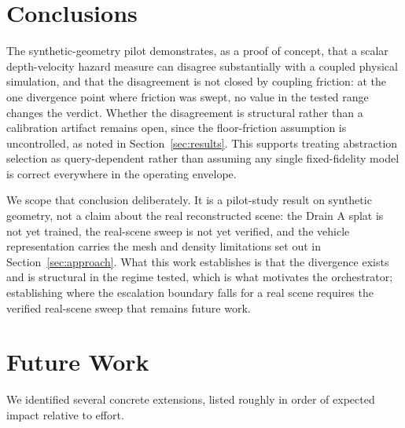 \documentclass[conference]{IEEEtran}
\begin{document}
\section{Conclusions}
\label{sec:conclusions}

The synthetic-geometry pilot demonstrates, as a proof of concept, that a scalar depth-velocity hazard measure can disagree substantially with a coupled physical simulation, and that the disagreement is not closed by coupling friction: at the one divergence point where friction was swept, no value in the tested range changes the verdict. Whether the disagreement is structural rather than a calibration artifact remains open, since the floor-friction assumption is uncontrolled, as noted in Section~\ref{sec:results}. This supports treating abstraction selection as query-dependent rather than assuming any single fixed-fidelity model is correct everywhere in the operating envelope.

We scope that conclusion deliberately. It is a pilot-study result on synthetic geometry, not a claim about the real reconstructed scene: the Drain A splat is not yet trained, the real-scene sweep is not yet verified, and the vehicle representation carries the mesh and density limitations set out in Section~\ref{sec:approach}. What this work establishes is that the divergence exists and is structural in the regime tested, which is what motivates the orchestrator; establishing where the escalation boundary falls for a real scene requires the verified real-scene sweep that remains future work.

\section{Future Work}
\label{sec:future}

We identified several concrete extensions, listed roughly in order of expected impact relative to effort.
\end{document}
